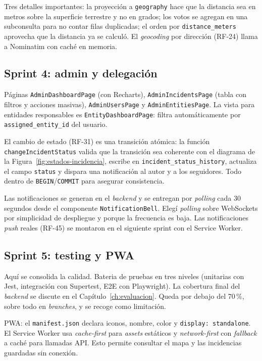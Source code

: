 Tres detalles importantes: la proyección a \texttt{geography} hace que la distancia sea en metros sobre la superficie terrestre y no en grados; los votos se agregan en una subconsulta para no contar filas duplicadas; el orden por \texttt{distance\_meters} aprovecha que la distancia ya se calculó. El \textit{geocoding} por dirección (RF-24) llama a Nominatim con caché en memoria.


\subsection{Sprint 4: admin y delegación}

Páginas \texttt{AdminDashboardPage} (con Recharts), \texttt{AdminIncidentsPage} (tabla con filtros y acciones masivas), \texttt{AdminUsersPage} y \texttt{AdminEntitiesPage}. La vista para entidades responsables es \texttt{EntityDashboardPage}: filtra automáticamente por \texttt{assigned\_entity\_id} del usuario.

El cambio de estado (RF-31) es una transición atómica: la función \texttt{changeIncidentStatus} valida que la transición sea coherente con el diagrama de la Figura~\ref{fig:estados-incidencia}, escribe en \texttt{incident\_status\_history}, actualiza el campo \texttt{status} y dispara una notificación al autor y a los seguidores. Todo dentro de \texttt{BEGIN}/\texttt{COMMIT} para asegurar consistencia.

Las notificaciones se generan en el \textit{backend} y se entregan por \textit{polling} cada 30 segundos desde el componente \texttt{NotificationBell}. Elegí \textit{polling} sobre WebSockets por simplicidad de despliegue y porque la frecuencia es baja. Las notificaciones \textit{push} reales (RF-45) se montaron en el siguiente sprint con el Service Worker.


\subsection{Sprint 5: testing y PWA}

Aquí se consolida la calidad. Bateria de pruebas en tres niveles (unitarias con Jest, integración con Supertest, E2E con Playwright). La cobertura final del \textit{backend} se discute en el Capítulo~\ref{ch:evaluacion}. Queda por debajo del 70\,\%, sobre todo en \textit{branches}, y se recoge como limitación.

PWA: el \texttt{manifest.json} declara iconos, nombre, color y \texttt{display: standalone}. El Service Worker usa \textit{cache-first} para \textit{assets} estáticos y \textit{network-first} con \textit{fallback} a caché para llamadas API. Esto permite consultar el mapa y las incidencias guardadas sin conexión.

